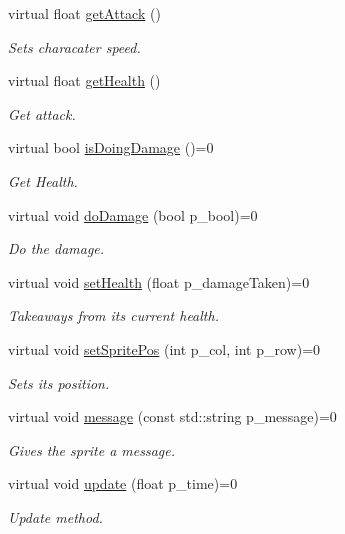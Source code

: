 \begin{DoxyCompactItemize}
virtual float \mbox{\hyperlink{class_sprite_interface_a9acb8edb465672a3e55d0b972a20c768}{get\+Attack}} ()
\begin{DoxyCompactList}\small\item\em Sets characater speed. \end{DoxyCompactList}\item 
\mbox{\label{class_sprite_interface_a4552ddf09fb794495ce4697c5af753b9}} 
virtual float \mbox{\hyperlink{class_sprite_interface_a4552ddf09fb794495ce4697c5af753b9}{get\+Health}} ()
\begin{DoxyCompactList}\small\item\em Get attack. \end{DoxyCompactList}\item 
virtual bool \mbox{\hyperlink{class_sprite_interface_a91a747b887e19cfc6e5256d4afc2f64c}{is\+Doing\+Damage}} ()=0
\begin{DoxyCompactList}\small\item\em Get Health. \end{DoxyCompactList}\item 
\mbox{\label{class_sprite_interface_a98f300b8d8e40f3dcd18c853353a1ac9}} 
virtual void \mbox{\hyperlink{class_sprite_interface_a98f300b8d8e40f3dcd18c853353a1ac9}{do\+Damage}} (bool p\+\_\+bool)=0
\begin{DoxyCompactList}\small\item\em Do the damage. \end{DoxyCompactList}\item 
virtual void \mbox{\hyperlink{class_sprite_interface_a56abad058843e3e4a7801f5b12cc6e18}{set\+Health}} (float p\+\_\+damage\+Taken)=0
\begin{DoxyCompactList}\small\item\em Takeaways from its current health. \end{DoxyCompactList}\item 
virtual void \mbox{\hyperlink{class_sprite_interface_a30511b7aaf2661d4f53db5b172dd365b}{set\+Sprite\+Pos}} (int p\+\_\+col, int p\+\_\+row)=0
\begin{DoxyCompactList}\small\item\em Sets its position. \end{DoxyCompactList}\item 
virtual void \mbox{\hyperlink{class_sprite_interface_ad5335c5370f97cd81a52769cb0a25559}{message}} (const std\+::string p\+\_\+message)=0
\begin{DoxyCompactList}\small\item\em Gives the sprite a message. \end{DoxyCompactList}\item 
virtual void \mbox{\hyperlink{class_sprite_interface_a3153bba12e2561f1719a75dbff0e6b4a}{update}} (float p\+\_\+time)=0
\begin{DoxyCompactList}\small\item\em Update method. \end{DoxyCompactList}\end{DoxyCompactItemize}
